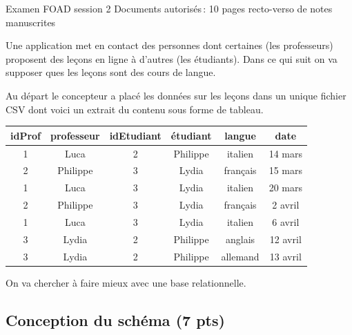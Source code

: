 %
%

%
{Examen FOAD session 2}%
{Documents autorisés\,: 10 pages recto-verso de notes manuscrites}%

Une application met en contact des personnes dont certaines (les professeurs)
proposent des leçons en ligne à d'autres (les étudiants). 
Dans ce qui suit on va supposer ques les leçons sont des cours de langue.


Au départ le concepteur a placé les données sur les leçons
dans un unique fichier CSV
dont voici un extrait du contenu sous forme de tableau.


\begin{center}
\begin{small}
\begin{tabular}{c|c|c|c|c|c}
\textbf{idProf} & \textbf{professeur} & \textbf{idEtudiant} &  \textbf{étudiant} & \textbf{langue} & \textbf{date} \\
\hline
\hline
1 & Luca & 2 & Philippe & italien & 14 mars\\
2 &  Philippe & 3 & Lydia & français & 15 mars\\
1 &  Luca & 3 & Lydia & italien & 20 mars\\
2 &  Philippe & 3 & Lydia & français & 2 avril \\
1 &  Luca & 3 & Lydia & italien & 6 avril\\
3 &  Lydia & 2 & Philippe & anglais & 12 avril \\
3 &  Lydia & 2 & Philippe & allemand & 13 avril \\
\hline
\end{tabular}
\end{small}
\end{center}

On va chercher à faire mieux avec une base relationnelle.

\subsection*{Conception du schéma (7 pts)}


